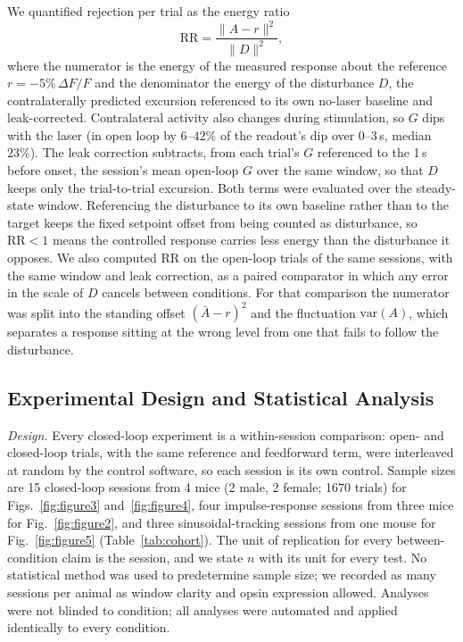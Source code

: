 We quantified rejection per trial as the energy ratio
%
\begin{equation}
    \mathrm{RR} = \frac{\lVert A - r \rVert^{2}}{\lVert D \rVert^{2}},
    \label{eq:rr}
\end{equation}
%
where the numerator is the energy of the measured response about the reference
$r = -5\%\,\Delta F/F$ and the denominator the energy of the disturbance $D$, the
contralaterally predicted excursion referenced to its own no-laser baseline and
leak-corrected. Contralateral activity also changes during stimulation, so $G$
dips with the laser (in open loop by $6$--$42\%$ of the readout's dip over 0--3\,s,
median $23\%$). The leak correction subtracts, from each trial's $G$
referenced to the 1\,s before onset, the session's mean open-loop $G$ over the
same window, so that $D$ keeps only the trial-to-trial excursion. Both terms
were evaluated over the steady-state window. Referencing the disturbance to its
own baseline rather than to the target keeps the fixed setpoint offset from
being counted as disturbance, so $\mathrm{RR} < 1$ means the controlled response
carries less energy than the disturbance it opposes. We also computed
$\mathrm{RR}$ on the open-loop trials of the same sessions, with the same window
and leak correction, as a paired comparator in which any error in the scale of
$D$ cancels between conditions. For that comparison the numerator was split into
the standing offset $(\bar{A}-r)^{2}$ and the fluctuation $\mathrm{var}(A)$,
which separates a response sitting at the wrong level from one that fails to
follow the disturbance.

\subsection*{Experimental Design and Statistical Analysis}
\label{sec:stats}

\emph{Design.} Every closed-loop experiment is a within-session comparison:
open- and closed-loop trials, with the same reference and feedforward term,
were interleaved at random by the control software, so each session is its own
control. Sample sizes are 15 closed-loop sessions from 4
mice (2 male, 2 female; 1670 trials) for Figs.~\ref{fig:figure3}
and~\ref{fig:figure4}, four impulse-response sessions from three mice for
Fig.~\ref{fig:figure2}, and three sinusoidal-tracking sessions from one mouse for
Fig.~\ref{fig:figure5} (Table~\ref{tab:cohort}). The unit of replication for
every between-condition claim is the session, and we state $n$ with its unit for
every test. No statistical method was used to predetermine sample size; we
recorded as many sessions per animal as window clarity and opsin expression
allowed. Analyses were not blinded to condition; all analyses were automated
and applied identically to every condition.

